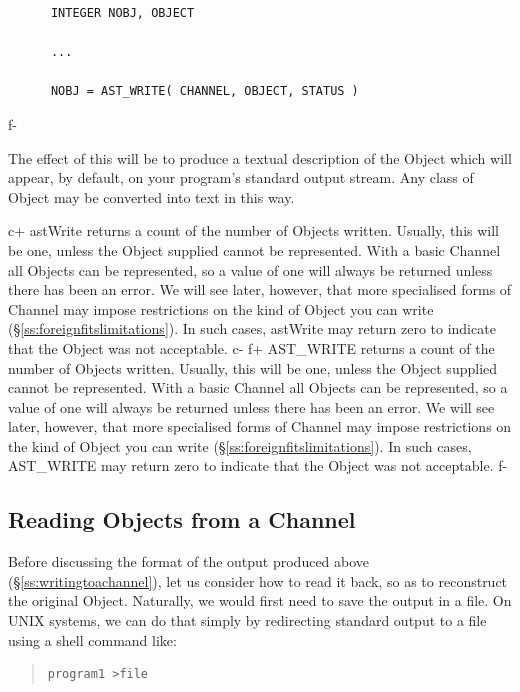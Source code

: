 \documentclass[twoside,11pt]{article}
\newcommand{\secref}[1]{\S\ref{#1}}
\newcommand{\secref}[1]{\ref{#1}}
\begin{document}
\small
\begin{verbatim}
      INTEGER NOBJ, OBJECT

      ...

      NOBJ = AST_WRITE( CHANNEL, OBJECT, STATUS )
\end{verbatim}
\normalsize
f-

The effect of this will be to produce a textual description of the
Object which will appear, by default, on your program's standard
output stream. Any class of Object may be converted into text in this
way.

c+
astWrite returns a count of the number of Objects written. Usually,
this will be one, unless the Object supplied cannot be
represented. With a basic Channel all Objects can be represented, so a
value of one will always be returned unless there has been an
error. We will see later, however, that more specialised forms of
Channel may impose restrictions on the kind of Object you can write
(\secref{ss:foreignfitslimitations}). In such cases, astWrite may
return zero to indicate that the Object was not acceptable.
c-
f+
AST\_WRITE returns a count of the number of Objects written. Usually,
this will be one, unless the Object supplied cannot be
represented. With a basic Channel all Objects can be represented, so a
value of one will always be returned unless there has been an
error. We will see later, however, that more specialised forms of
Channel may impose restrictions on the kind of Object you can write
(\secref{ss:foreignfitslimitations}). In such cases, AST\_WRITE may
return zero to indicate that the Object was not acceptable.
f-

\subsection{\label{ss:readingfromachannel}Reading Objects from a Channel}

Before discussing the format of the output produced above
(\secref{ss:writingtoachannel}), let us consider how to read it back,
so as to reconstruct the original Object. Naturally, we would first
need to save the output in a file. On UNIX systems, we can do that
simply by redirecting standard output to a file using a shell command
like:

\begin{quote}
\small
\begin{verbatim}
program1 >file
\end{verbatim}
\normalsize
\end{quote}
\end{document}

